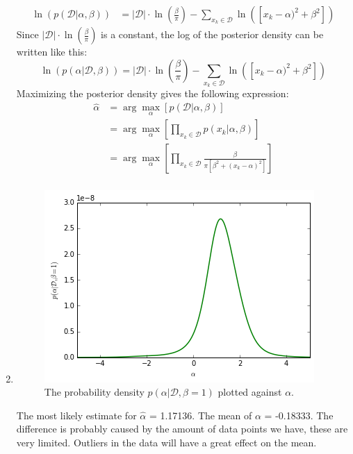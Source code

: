 \documentclass[a4paper,10pt]{article}
\numberwithin{equation}{section} %
\numberwithin{figure}{section} %
\numberwithin{table}{section} %
\theoremstyle{mytheor}
\begin{document}
\begin{enumerate}
\begin{align}
		\ln(p(\mathcal{D} | \alpha, \beta)) &= \bigg \vert \mathcal{D}\bigg \vert \cdot \ln(\frac{\beta}{\pi}) - \sum_{x_k \in \mathcal{D}} \ln([x_k - \alpha)^2 + \beta^2])
		\end{align}
		Since $\bigg \vert \mathcal{D}\bigg \vert \cdot \ln(\frac{\beta}{\pi})$ is a constant, the log of the posterior density can be written like this:
		\begin{equation}
		\ln(p(\alpha | \mathcal{D}, \beta)) = \bigg \vert \mathcal{D}\bigg \vert \cdot \ln(\frac{\beta}{\pi}) - \sum_{x_k \in \mathcal{D}} \ln([x_k - \alpha)^2 + \beta^2]) \tag{Assignment eq. 9}
		\end{equation}
		Maximizing the posterior density gives the following expression:
		\begin{align}
		\hat \alpha &= \arg \max_\alpha [p(\mathcal{D} | \alpha, \beta)]\\
		&= \arg \max_\alpha [\prod_{x_k \in \mathcal{D}} p(x_k | \alpha, \beta)]\\
		&= \arg \max_\alpha [\prod_{x_k \in \mathcal{D}} \frac{\beta}{\pi[\beta^2 + (x_k - \alpha)^2]}]\\
		\end{align}
	\item \begin{figure}[h!]
   			\centering
   			\includegraphics{alpharoni.png}\vspace{-0.2cm}
   			\caption{\vspace{-0.2cm} The probability density $p(\alpha | \mathcal{D}, \beta = 1)$ plotted against $\alpha$.}
  		\end{figure}
  		The most likely estimate for $\hat{\alpha}$ = 1.17136. The mean of $\alpha$ = -0.18333. The difference is probably caused by the amount of data points we have, these are very limited. Outliers in the data will have a great effect on the mean.
\end{enumerate}
\end{document}
